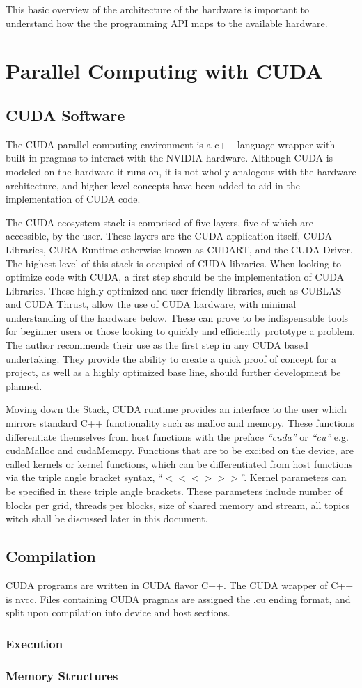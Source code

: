 This basic overview of the architecture of the hardware is important to understand
how the the programming API maps to the available hardware.

\section{Parallel Computing with CUDA}
\subsection{CUDA Software}

The CUDA parallel computing environment is a c++ language wrapper with built in
pragmas to interact with the NVIDIA hardware.  Although CUDA is modeled on the
hardware it runs on, it is not wholly analogous with the hardware architecture,
and higher level concepts have been added to aid in the implementation of CUDA code.
\par
 The CUDA ecosystem stack is comprised of five layers, five of which are accessible, by the user.
These layers are the CUDA application itself, CUDA Libraries, CURA Runtime otherwise
known as CUDART, and the CUDA Driver. The highest level of this stack is occupied
of CUDA libraries. When looking to optimize code with CUDA, a
first step should be the implementation of CUDA Libraries.  These highly optimized
and user friendly libraries, such as CUBLAS and CUDA Thrust, allow the use of
CUDA hardware, with minimal understanding of the hardware below.  These can prove
to be indispensable tools for beginner users or those looking to quickly and
efficiently prototype a problem. The author recommends their use as the first step
in any CUDA based undertaking. They provide the ability to create a quick proof
of concept for a project, as well as a highly optimized base line, should further
development be planned.
\par
Moving down the Stack, CUDA runtime provides an interface to the user which mirrors
standard C++ functionality such as malloc and memcpy.  These functions differentiate
themselves from host functions with the preface \textit{``cuda''} or \textit{``cu''}
e.g. cudaMalloc and cudaMemcpy.  Functions that are to be excited on the
device, are called kernels or kernel functions, which can be differentiated from
host functions via the triple angle bracket syntax, ``$<<< >>>$''.
Kernel parameters can be specified in these triple angle brackets.  These parameters
include number of blocks per grid, threads per blocks, size of shared memory and
stream, all topics witch shall be discussed later in this document. %




\subsection{Compilation}

CUDA programs are written in CUDA flavor C++.  The CUDA wrapper of C++ is nvcc.
Files containing CUDA pragmas are assigned the .cu ending format, and split upon
compilation into device and host sections.
\subsubsection{Execution}

\subsubsection{Memory Structures}
